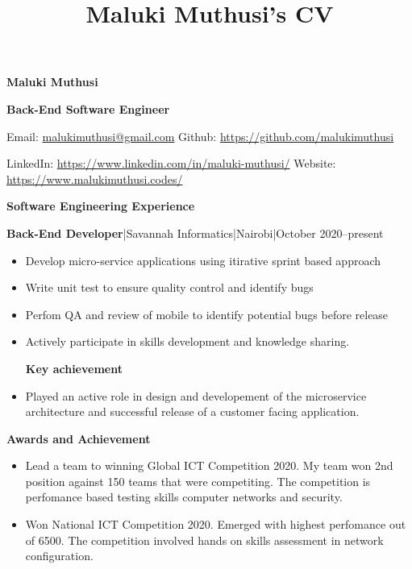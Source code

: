 \documentclass[a4paper]{article}
\begin{document}
\title{Maluki Muthusi's CV}

\begin{center}
    {\Large \textbf{Maluki Muthusi}} \par
    {\large \textbf{Back-End Software Engineer}}
\end{center}
Email: \href{mailto:malukimuthusi@gmail.com}{malukimuthusi@gmail.com} \hfill
Github:  \url{https://github.com/malukimuthusi} \hfill\par
LinkedIn: \url{https://www.linkedin.com/in/maluki-muthusi/}\hfill
Website: \url{https://www.malukimuthusi.codes/} \hfill \par

\begin{center}
    {\Large \textbf{Software Engineering Experience}}
\end{center}
\textbf{Back-End Developer}|Savannah Informatics|Nairobi|October 2020--present
\begin{itemize}[noitemsep]
    \item Develop micro-service applications using itirative sprint based approach
    \item Write unit test to ensure quality control and identify bugs
    \item Perfom QA and review of mobile to identify potential bugs before release
    \item Actively participate in skills development and knowledge sharing.
          \begin{center}
              \textbf{Key achievement}
          \end{center}
    \item Played an active role in design and developement of the microservice architecture and successful release of a customer facing application.
\end{itemize}

\begin{center}
    {\Large \textbf{Awards and Achievement}}
\end{center}
\begin{itemize}[noitemsep]
    \item Lead a team to winning Global ICT Competition 2020. My team won 2nd position against 150 teams that were competiting. The competition is perfomance based testing skills computer networks and security.
    \item Won National ICT Competition 2020. Emerged with highest perfomance out of 6500. The competition involved hands on skills assessment in network configuration.
\end{itemize}
\end{document}
